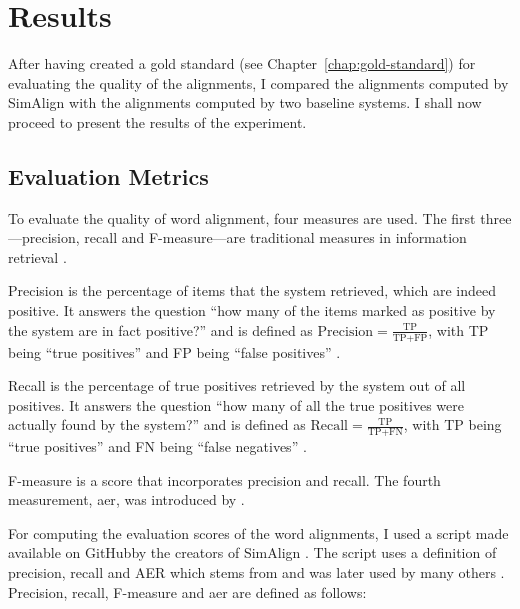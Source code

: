 \chapter{Results}\label{chap:results}

After having created a gold standard (see Chapter~\ref{chap:gold-standard}) for evaluating the quality of the alignments, I compared the alignments computed by SimAlign with the alignments computed by two baseline systems.
I shall now proceed to present the results of the experiment.

\section{Evaluation Metrics}
\label{sec:evaluation-metrics}
To evaluate the quality of word alignment, four measures are used. 
The first three---precision, recall and F-measure---are traditional measures in information retrieval \autocite{mihalcea-pedersen-2003-evaluation}.

Precision is the percentage of items that the system retrieved, which are indeed positive.
It answers the question \enquote{how many of the items marked as positive by the system are in fact positive?} and is defined as $\text{Precision}=\frac{\text{TP}}{\text{TP}+\text{FP}}$, with TP being \enquote{true positives} and FP being \enquote{false positives} \autocite[67]{jurafsky-2019}.

Recall is the percentage of true positives retrieved by the system out of all positives.
It answers the question \enquote{how many of all the true positives were actually found by the system?} and is defined as $\text{Recall}=\frac{\text{TP}}{\text{TP}+\text{FN}}$, with TP being \enquote{true positives} and FN being \enquote{false negatives} \autocite[67]{jurafsky-2019}.

F-measure is a score that incorporates precision and recall. 
The fourth measurement, \acrfull{aer}, was introduced by \cite{och-ney-2000-improved}. 

For computing the evaluation scores of the word alignments, I used a script made available on GitHub\footnotemark by the creators of SimAlign \autocite{jalili-sabet-etal-2020-simalign}. 
The script uses a definition of precision, recall and AER which stems from \cite{och-ney-2000-improved} and was later used by many others \autocites{mihalcea-pedersen-2003-evaluation,och-ney-2003-systematic,Ostling2016efmaral,jalili-sabet-etal-2020-simalign}. Precision, recall, F-measure and \acrshort{aer} are defined as follows:

